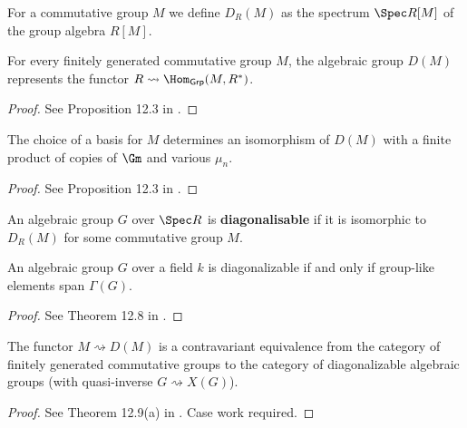 \begin{definition}
  \label{0-spec-grp-alg}
  \leanok

  For a commutative group $M$ we define $D_R(M)$ as the spectrum $\Spec R[M]$ of the group algebra $R[M]$.
\end{definition}


\begin{proposition}
  \label{DM_func}

  For every finitely generated commutative group $M$, the algebraic group $D(M)$
  represents the functor $R \rightsquigarrow \Hom_{\mathsf{Grp}}(M,R^*)$.
\end{proposition}
\begin{proof}
  See Proposition 12.3 in \cite{Milne_2017}.
\end{proof}


\begin{proposition}
  \label{0-spec-grp-alg-basis}

  The choice of a basis for $M$ determines an isomorphism of $D(M)$
  with a finite product of copies of $\Gm$ and various $\mu_n$.
\end{proposition}
\begin{proof}
  See Proposition 12.3 in \cite{Milne_2017}.
\end{proof}


\begin{definition}
  \label{0-diag}

  An algebraic group $G$ over $\Spec R$ is {\bf diagonalisable}
  if it is isomorphic to $D_R(M)$ for some commutative group $M$.
\end{definition}

\begin{theorem}
  \label{0-diag-iff-grp-like-span}
  An algebraic group $G$ over a field $k$ is diagonalizable
  if and only if group-like elements span $\Gamma(G)$.
\end{theorem}
\begin{proof}
  See Theorem 12.8 in \cite{Milne_2017}.
\end{proof}

\begin{theorem}
  \label{congr_fggrp_diag}
  The functor $M\rightsquigarrow D(M)$ is a contravariant equivalence
  from the category of finitely generated commutative groups to the category of
  diagonalizable algebraic groups (with quasi-inverse $G \rightsquigarrow X(G)$).
\end{theorem}
\begin{proof}

  See Theorem 12.9(a) in \cite{Milne_2017}. Case work required.
\end{proof}
